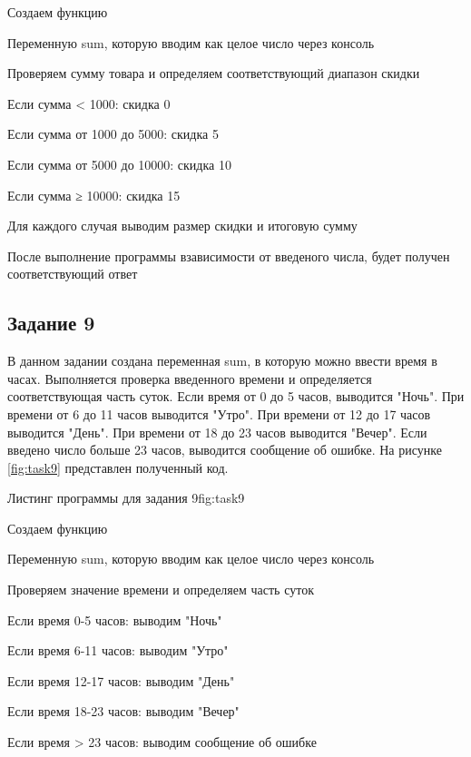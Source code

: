 \documentclass{vvsu}
\begin{document}
\begin{vvsu_list}
\item Создаем функцию
\item Переменную sum, которую вводим как целое число через консоль
\item Проверяем сумму товара и определяем соответствующий диапазон скидки
\item Если сумма < 1000: скидка 0%
\item Если сумма от 1000 до 5000: скидка 5%
\item Если сумма от 5000 до 10000: скидка 10%
\item Если сумма ≥ 10000: скидка 15%
\item Для каждого случая выводим размер скидки и итоговую сумму
\end{vvsu_list}


После выполнение программы взависимости от введеного числа, будет получен соответствующий ответ

\subsection{Задание 9}
В данном задании создана переменная sum, в которую можно ввести время в часах. Выполняется проверка введенного времени и определяется соответствующая часть суток. Если время от 0 до 5 часов, выводится "Ночь". При времени от 6 до 11 часов выводится "Утро". При времени от 12 до 17 часов выводится "День". При времени от 18 до 23 часов выводится "Вечер". Если введено число больше 23 часов, выводится сообщение об ошибке. На рисунке \ref{fig:task9} представлен полученный код.
\begin{vvsu_figure}{Листинг программы для задания 9}{fig:task9}
    \begin{minipage}{.75\textwidth}
        
    \end{minipage}
\end{vvsu_figure}

\begin{vvsu_list}
\item Создаем функцию
\item Переменную sum, которую вводим как целое число через консоль
\item Проверяем значение времени и определяем часть суток
\item Если время 0-5 часов: выводим "Ночь"
\item Если время 6-11 часов: выводим "Утро"
\item Если время 12-17 часов: выводим "День"
\item Если время 18-23 часов: выводим "Вечер"
\item Если время > 23 часов: выводим сообщение об ошибке
\end{vvsu_list}
\end{document}

